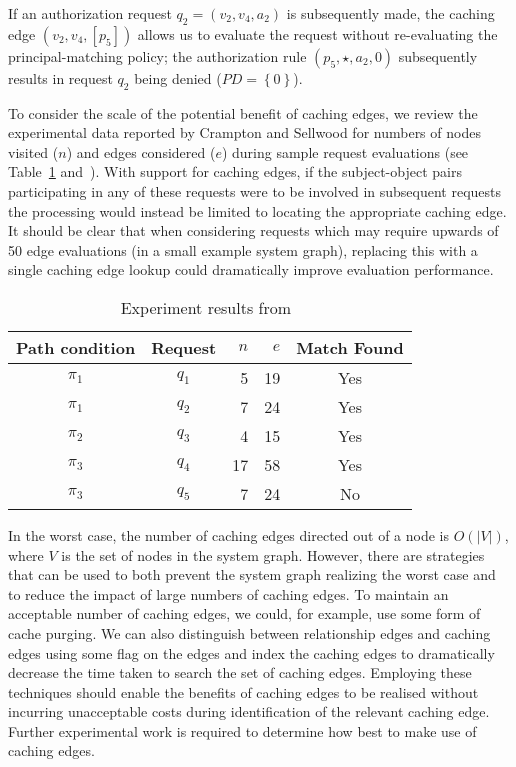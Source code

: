 \documentclass{article}
\newcommand{\set}[1]{\ensuremath{\left\{#1\right\}}} \newcommand{\sett}[1]{\ensuremath{\left\{\textit{#1}\right\}}} \newcommand{\tuple}[1]{\ensuremath{\left(#1\right)}} \newcommand{\tuplet}[1]{\ensuremath{\left(\textit{#1}\right)}}
\newcommand{\pd}{\mathit{PD}}
\begin{document}
If an authorization request $q_2 = (v_2,v_4,a_2)$ is subsequently made, the caching edge $(v_2,v_4,[p_5])$ allows us to evaluate the request without re-evaluating the principal-matching policy; the authorization rule $(p_5,\star,a_2,0)$ subsequently results in request $q_2$ being denied ($\pd = \set{0}$).

To consider the scale of the potential benefit of caching edges, we review the experimental data reported by Crampton and Sellwood for numbers of nodes visited ($n$) and edges considered ($e$) during sample request evaluations (see Table~\ref{tbl:implementation_metrics} and~\cite[\S{3.3}]{CramptonS14}).
With support for caching edges, if the subject-object pairs participating in any of these requests were to be involved in subsequent requests the processing would instead be limited to locating the appropriate caching edge.
It should be clear that when considering requests which may require upwards of 50 edge evaluations (in a small example system graph), replacing this with a single caching edge lookup could dramatically improve evaluation performance.

\begin{table}[!ht]\centering
  \caption{Experiment results from~\cite[\S{3.3}]{CramptonS14}}\label{tbl:implementation_metrics}
  {\renewcommand{\arraystretch}{1.25}
\begin{tabular}{|c|c|r|r|c|}
    \hline
        \bf Path condition & \bf Request & $n$ & $e$ & \bf Match Found\\
    \hline
    \hline
        $\pi_1$ & $q_1$ & 5 & 19 & Yes\\
        $\pi_1$ & $q_2$ & 7 & 24 & Yes\\
        $\pi_2$  & $q_3$ & 4 & 15 & Yes\\
        $\pi_3$ & $q_4$ & 17 & 58 & Yes\\
        $\pi_3$ & $q_5$ & 7 & 24 & No\\
    \hline
  \end{tabular}}
\end{table}

In the worst case, the number of caching edges directed out of a node is $O(|V|)$, where $V$ is the set of nodes in the system graph.
However, there are strategies that can be used to both prevent the system graph realizing the worst case and to reduce the impact of large numbers of caching edges.
To maintain an acceptable number of caching edges, we could, for example, use some form of cache purging.
We can also distinguish between relationship edges and caching edges using some flag on the edges and index the caching edges to dramatically decrease the time taken to search the set of caching edges.
Employing these techniques should enable the benefits of caching edges to be realised without incurring unacceptable costs during identification of the relevant caching edge.
Further experimental work is required to determine how best to make use of caching edges.
\end{document}
